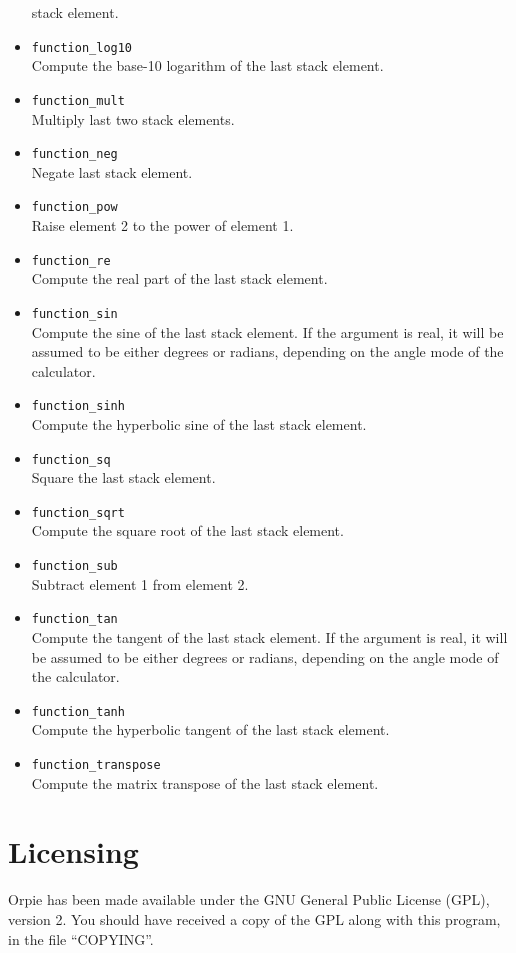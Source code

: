 \documentclass[11pt,notitlepage]{article}
\begin{document}
\begin{itemize}
      stack element.
   \item {\tt function\_log10} \\
      Compute the base-10 logarithm of the last stack element.
   \item {\tt function\_mult} \\
      Multiply last two stack elements.
   \item {\tt function\_neg} \\
      Negate last stack element.
   \item {\tt function\_pow} \\
      Raise element 2 to the power of element 1.
   \item {\tt function\_re} \\
      Compute the real part of the last stack element.
   \item {\tt function\_sin} \\
      Compute the sine of the last stack element.  If the argument is real, it
      will be assumed to be either degrees or radians, depending on the angle
      mode of the calculator.
   \item {\tt function\_sinh} \\
      Compute the hyperbolic sine of the last stack element.
   \item {\tt function\_sq} \\
      Square the last stack element.
   \item {\tt function\_sqrt} \\
      Compute the square root of the last stack element.
   \item {\tt function\_sub} \\
      Subtract element 1 from element 2.
   \item {\tt function\_tan} \\
      Compute the tangent of the last stack element.  If the argument is real,
      it will be assumed to be either degrees or radians, depending on the
      angle mode of the calculator.
   \item {\tt function\_tanh} \\
      Compute the hyperbolic tangent of the last stack element.
   \item {\tt function\_transpose} \\
      Compute the matrix transpose of the last stack element.
\end{itemize}


\section{Licensing}
Orpie has been made available under the GNU General Public License (GPL), 
version 2.  You should have received a copy of the GPL along with this 
program, in the file ``COPYING''.
\end{document}
